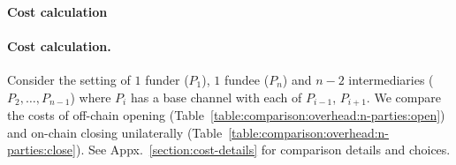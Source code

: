   \makeatletter%
    {\paragraph{Cost calculation}}%
    {\paragraph{Cost calculation.}}%
  \makeatother%
  Consider the setting of $1$
  funder ($P_1$), $1$ fundee ($P_n$) and $n-2$ intermediaries ($P_2, \dots,
  P_{n-1}$) where $P_i$ has a base channel with each of $P_{i-1}$,
  $P_{i+1}$. We compare the costs of off-chain opening
  (Table~\ref{table:comparison:overhead:n-parties:open}) and on-chain
  closing unilaterally
  (Table~\ref{table:comparison:overhead:n-parties:close}).
  See Appx.~\ref{section:cost-details} for comparison details and choices.

